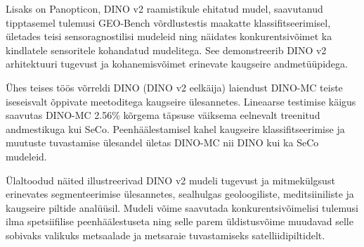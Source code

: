 Lisaks on Panopticon, DINO v2 raamistikule ehitatud mudel, saavutanud
 tipptasemel tulemusi GEO-Bench võrdlustestis maakatte klassifitseerimisel,
 ületades teisi sensoragnostilisi mudeleid ning näidates konkurentsivõimet ka
 kindlatele sensoritele kohandatud mudelitega. See demonstreerib DINO v2
 arhitektuuri tugevust ja kohanemisvõimet erinevate kaugseire andmetüüpidega. \cite{PanopticonAdvancingAnySensor}

Ühes teises töös võrreldi DINO (DINO v2 eelkäija) laiendust DINO-MC teiste
iseseisvalt õppivate meetoditega kaugseire ülesannetes. Lineaarse testimise
käigus saavutas DINO-MC 2.56\% kõrgema täpsuse väiksema eelnevalt treenitud
andmestikuga kui SeCo. Peenhäälestamisel kahel kaugseire klassifitseerimise ja
muutuste tuvastamise ülesandel ületas DINO-MC nii DINO kui ka SeCo mudeleid. \cite{ExtendingGloballocalView}

Ülaltoodud näited illustreerivad DINO v2 mudeli tugevust ja mitmekülgsust
erinevates segmenteerimise ülesannetes, sealhulgas geoloogiliste, meditsiiniliste
ja kaugseire piltide analüüsil. Mudeli võime saavutada konkurentsivõimelisi
tulemusi ilma spetsiifilise peenhäälestuseta ning selle parem üldistusvõime
muudavad selle sobivaks valikuks metsaalade ja metsaraie tuvastamiseks
satelliidipiltidelt.